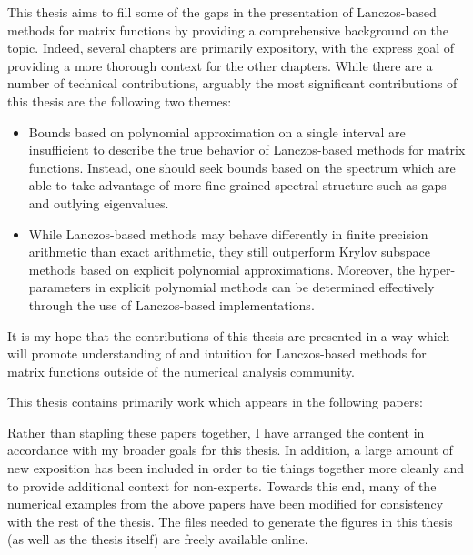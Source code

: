This thesis aims to fill some of the gaps in the presentation of Lanczos-based methods for matrix functions by providing a comprehensive background on the topic.
Indeed, several chapters are primarily expository, with the express goal of providing a more thorough context for the other chapters. 
While there are a number of technical contributions, arguably the most significant contributions of this thesis are the following two themes:
\begin{itemize}
    \item 
        Bounds based on polynomial approximation on a single interval are insufficient to describe the true behavior of Lanczos-based methods for matrix functions. 
    Instead, one should seek bounds based on the spectrum which are able to take advantage of more fine-grained spectral structure such as gaps and outlying eigenvalues.
    \item 
        While Lanczos-based methods may behave differently in finite precision arithmetic than exact arithmetic, they still outperform Krylov subspace methods based on explicit polynomial approximations. 
        Moreover, the hyper-parameters in explicit polynomial methods can be determined effectively through the use of Lanczos-based implementations.
\end{itemize}
It is my hope that the contributions of this thesis are presented in a way which will promote understanding of and intuition for Lanczos-based methods for matrix functions outside of the numerical analysis community.



This thesis contains primarily work which appears in the following papers:

\begin{refsection}
    \nocite{
    chen_trogdon_ubaru_22,
    chen_trogdon_ubaru_21,
    chen_greenbaum_musco_musco_22a,
    chen_greenbaum_musco_musco_22b,
    }
    \printbibliography[heading=none]
\end{refsection}

Rather than stapling these papers together, I have arranged the content in accordance with my broader goals for this thesis.
In addition, a large amount of new exposition has been included in order to tie things together more cleanly and to provide additional context for non-experts.
Towards this end, many of the numerical examples from the above papers have been modified for consistency with the rest of the thesis.
The files needed to generate the figures in this thesis (as well as the thesis itself) are freely available online.




